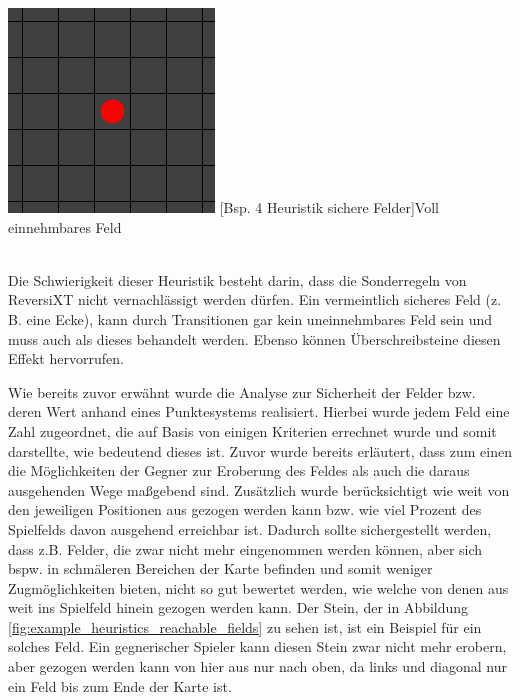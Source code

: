 \documentclass[12pt,a4paper,bibliography=totocnumbered,listof=totocnumbered]{article}
\begin{document}
\vspace{1em}
\begin{minipage}{\linewidth}
	\centering
	\includegraphics[width=0.3\linewidth]{pics/heuristics_safe_fields_middle.png}
	[Bsp. 4 Heuristik sichere Felder]{Voll einnehmbares Feld}
	\label{fig:example_heuristics_safe_fields_middle}
\end{minipage}
\\

Die Schwierigkeit dieser Heuristik besteht darin, dass die Sonderregeln von ReversiXT nicht vernachlässigt werden dürfen. Ein vermeintlich sicheres Feld (z. B. eine Ecke), kann durch Transitionen gar kein uneinnehmbares Feld sein und muss auch als dieses behandelt werden. Ebenso können Überschreibsteine diesen Effekt hervorrufen.

Wie bereits zuvor erwähnt wurde die Analyse zur Sicherheit der Felder bzw. deren Wert anhand eines Punktesystems realisiert. Hierbei wurde jedem Feld eine Zahl zugeordnet, die auf Basis von einigen Kriterien errechnet wurde und somit darstellte, wie bedeutend dieses ist. Zuvor wurde bereits erläutert, dass zum einen die Möglichkeiten der Gegner zur Eroberung des Feldes als auch die daraus ausgehenden Wege maßgebend sind. Zusätzlich wurde berücksichtigt wie weit von den jeweiligen Positionen aus gezogen werden kann bzw. wie viel Prozent des Spielfelds davon ausgehend erreichbar ist. Dadurch sollte sichergestellt werden, dass z.B. Felder, die zwar nicht mehr eingenommen werden können, aber sich bspw. in schmäleren Bereichen der Karte befinden und somit weniger Zugmöglichkeiten bieten, nicht so gut bewertet werden, wie welche von denen aus weit ins Spielfeld hinein gezogen werden kann. Der Stein, der in Abbildung \ref{fig:example_heuristics_reachable_fields} zu sehen ist, ist ein Beispiel für ein solches Feld. Ein gegnerischer Spieler kann diesen Stein zwar nicht mehr erobern, aber gezogen werden kann von hier aus nur nach oben, da links und diagonal nur ein Feld bis zum Ende der Karte ist.
\end{document}
